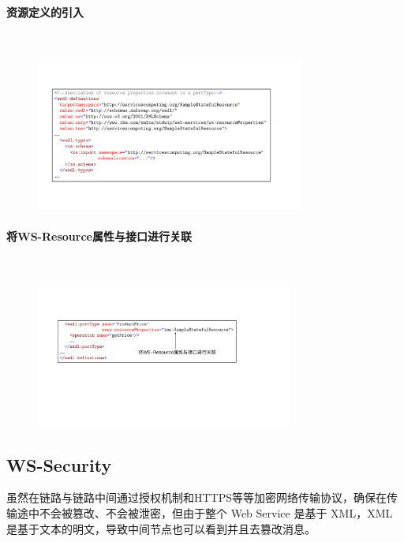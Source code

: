 \paragraph*{资源定义的引入}~{} \par
\begin{figure}[H]
    \vspace{-0.5em}
	\centering
	\includegraphics[width=0.79\textwidth]{images/资源定义的引入.pdf}
    \vspace{-1em}
\end{figure}

\paragraph*{将WS-Resource属性与接口进行关联}~{} \par
\begin{figure}[H]
    \vspace{-0.5em}
	\centering
	\includegraphics[width=0.75\textwidth]{images/将WS-Resource属性与接口进行关联.pdf}
    \vspace{-1.5em}
\end{figure}

\subsection{WS-Security}
虽然在链路与链路中间通过授权机制和HTTPS等等加密网络传输协议，确保在传输途中不会被篡改、不会被泄密，但由于整个 Web Service 是基于 XML，XML 是基于文本的明文，导致中间节点也可以看到并且去篡改消息。

